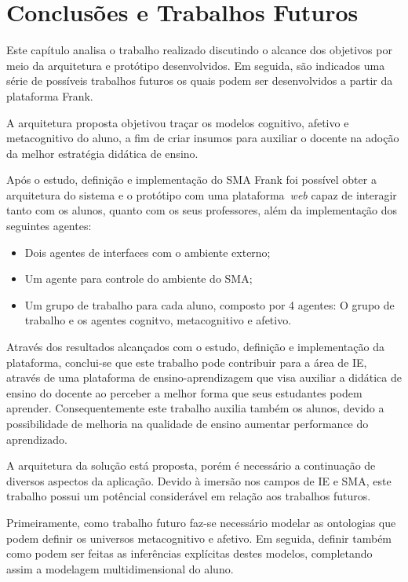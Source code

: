 \chapter{Conclusões e Trabalhos Futuros}
Este capítulo analisa o trabalho realizado discutindo o alcance dos objetivos por meio da arquitetura e protótipo desenvolvidos. Em seguida, são indicados uma série de possíveis trabalhos futuros os quais podem ser desenvolvidos a partir da plataforma Frank.

A arquitetura proposta objetivou traçar os modelos cognitivo, afetivo e metacognitivo do aluno, a fim de criar insumos para auxiliar o docente na adoção da melhor estratégia didática de ensino.

Após o estudo, definição e implementação do SMA Frank foi possível obter a arquitetura do sistema e o protótipo com uma plataforma~\emph{web} capaz de interagir tanto com os alunos, quanto com os seus professores, além da implementação dos seguintes agentes:
\begin{itemize}
 	\item Dois agentes de interfaces com o ambiente externo;
	\item Um agente para controle do ambiente do SMA;
	\item Um grupo de trabalho para cada aluno, composto por 4 agentes: O grupo de trabalho e os agentes cognitvo, metacognitivo e afetivo.
\end{itemize}

Através dos resultados alcançados com o estudo, definição e implementação da plataforma, conclui-se que este trabalho pode contribuir para a área de IE, através de uma plataforma de ensino-aprendizagem que visa auxiliar a didática de ensino do docente ao perceber a melhor forma que seus estudantes podem aprender. Consequentemente este trabalho auxilia também os alunos, devido a possibilidade de melhoria na qualidade de ensino aumentar performance do aprendizado. 

A arquitetura da solução está proposta, porém é necessário a continuação de diversos aspectos da aplicação. Devido à imersão nos campos de IE e SMA, este trabalho possui um potêncial considerável em relação aos trabalhos futuros.

Primeiramente, como trabalho futuro faz-se necessário modelar as ontologias que podem definir os universos metacognitivo e afetivo. Em seguida, definir também como podem ser feitas as inferências explícitas destes modelos, completando assim a modelagem multidimensional do aluno.

